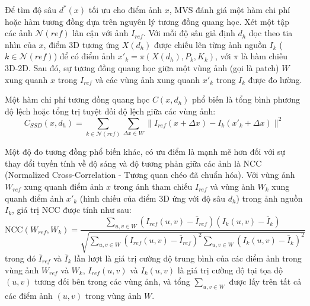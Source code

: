 Để tìm độ sâu $d^*(x)$ tối ưu cho điểm ảnh $x$, MVS đánh giá một hàm chi phí hoặc hàm tương đồng dựa trên nguyên lý tương đồng quang học. Xét một tập các ảnh $\mathcal{N}(ref)$ lân cận với ảnh $I_{ref}$. Với mỗi độ sâu giả định $d_h$ dọc theo tia nhìn của $x$, điểm 3D tương ứng $X(d_h)$ được chiếu lên từng ảnh nguồn $I_k$ ($k \in \mathcal{N}(ref)$) để có điểm ảnh $x'_k = \pi(X(d_h), P_k, K_k)$, với $\pi$ là hàm chiếu 3D-2D. Sau đó, sự tương đồng quang học giữa một vùng ảnh (gọi là patch) $W$ xung quanh $x$ trong $I_{ref}$ và các vùng ảnh xung quanh $x'_k$ trong $I_k$ được đo lường.

Một hàm chi phí tương đồng quang học $C(x, d_h)$ phổ biến là tổng bình phương độ lệch hoặc tổng trị tuyệt đối độ lệch giữa các vùng ảnh:
\begin{equation}
    C_{SSD}(x, d_h) = \sum_{k \in \mathcal{N}(ref)} \sum_{\Delta x \in W} \| I_{ref}(x+\Delta x) - I_k(x'_k+\Delta x) \|^2
\end{equation}

Một độ đo tương đồng phổ biến khác, có ưu điểm là mạnh mẽ hơn đối với sự thay đổi tuyến tính về độ sáng và độ tương phản giữa các ảnh là NCC (Normalized Cross-Correlation - Tương quan chéo đã chuẩn hóa). Với vùng ảnh $W_{ref}$ xung quanh điểm ảnh $x$ trong ảnh tham chiếu $I_{ref}$ và vùng ảnh $W_k$ xung quanh điểm ảnh $x'_k$ (hình chiếu của điểm 3D ứng với độ sâu $d_h$) trong ảnh nguồn $I_k$, giá trị NCC được tính như sau:
\begin{equation} \label{eq:ncc}
    \text{NCC}(W_{ref}, W_k) = \frac{\sum_{u,v \in W} (I_{ref}(u,v) - \bar{I}_{ref}) (I_k(u,v) - \bar{I}_{k})}{\sqrt{\sum_{u,v \in W} (I_{ref}(u,v) - \bar{I}_{ref})^2 \sum_{u,v \in W} (I_k(u,v) - \bar{I}_{k})^2}}
\end{equation}
trong đó $\bar{I}_{ref}$ và $\bar{I}_{k}$ lần lượt là giá trị cường độ trung bình của các điểm ảnh trong vùng ảnh $W_{ref}$ và $W_k$, $I_{ref}(u,v)$ và $I_k(u,v)$ là giá trị cường độ tại tọa độ $(u,v)$ tương đối bên trong các vùng ảnh, và tổng $\sum_{u,v \in W}$ được lấy trên tất cả các điểm ảnh $(u,v)$ trong vùng ảnh $W$.

